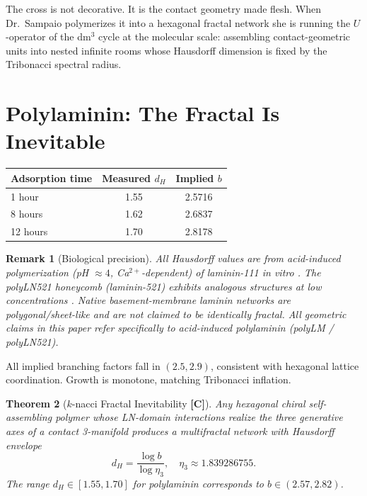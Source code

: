 \documentclass[12pt,a4paper]{article}
\newtheorem{theorem}{Theorem}[section]
\newtheorem{remark}[theorem]{Remark}
\newcommand{\etatrib}{\eta_3}
\begin{document}
The cross is not decorative. It is the contact geometry made flesh. When
Dr.\ Sampaio polymerizes it into a hexagonal fractal network she is
running the $U$-operator of the dm$^3$ cycle at the molecular scale:
assembling contact-geometric units into nested infinite rooms whose
Hausdorff dimension is fixed by the Tribonacci spectral radius.


\section{Polylaminin: The Fractal Is Inevitable}
\label{sec:polylaminin}

\begin{center}
\begin{tabular}{lcc}
\toprule
Adsorption time & Measured $d_H$ \cite{hochman2014} & Implied $b$ \\
\midrule
1 hour   & 1.55 & 2.5716 \\
8 hours  & 1.62 & 2.6837 \\
12 hours & 1.70 & 2.8178 \\
\bottomrule
\end{tabular}
\end{center}

\begin{remark}[Biological precision]
All Hausdorff values are from acid-induced polymerization
(pH $\approx 4$, Ca$^{2+}$-dependent) of laminin-111 \textit{in vitro}
\cite{hochman2014}. The polyLN521 honeycomb (laminin-521) exhibits
analogous structures at low concentrations \cite{mesquita2022}.
Native basement-membrane laminin networks are polygonal/sheet-like and
are \emph{not} claimed to be identically fractal. All geometric claims
in this paper refer specifically to acid-induced polylaminin
(polyLM / polyLN521).
\end{remark}

All implied branching factors fall in $(2.5,2.9)$, consistent with
hexagonal lattice coordination. Growth is monotone, matching Tribonacci
inflation.

\begin{theorem}[$k$-nacci Fractal Inevitability \textbf{[C]}]
\label{thm:fractal}
Any hexagonal chiral self-assembling polymer whose LN-domain interactions
realize the three generative axes of a contact 3-manifold produces a
multifractal network with Hausdorff envelope
\[
d_H = \frac{\log b}{\log\etatrib},\quad \etatrib\approx 1.839286755.
\]
The range $d_H\in[1.55,1.70]$ for polylaminin corresponds to
$b\in(2.57,2.82)$.
\end{theorem}
\end{document}

